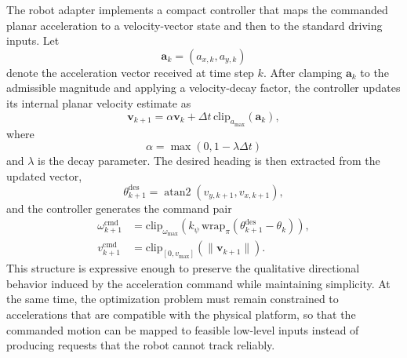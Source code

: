 The robot adapter implements a compact controller that maps the commanded planar acceleration to a
velocity-vector state and then to the standard driving inputs.
Let
\[
\mathbf{a}_k = (a_{x,k}, a_{y,k})
\]
denote the acceleration vector received at time step \(k\).
After clamping \(\mathbf{a}_k\) to the admissible magnitude and applying a velocity-decay factor, the
controller updates its internal planar velocity estimate as
\begin{equation}
\mathbf{v}_{k+1} = \alpha \mathbf{v}_k + \Delta t \,\mathrm{clip}_{a_{\max}}(\mathbf{a}_k),
\end{equation}
where
\[
\alpha = \max(0, 1 - \lambda \Delta t)
\]
and \(\lambda\) is the decay parameter.
The desired heading is then extracted from the updated vector,
\begin{equation}
\theta^{\mathrm{des}}_{k+1} = \operatorname{atan2}(v_{y,k+1}, v_{x,k+1}),
\end{equation}
and the controller generates the command pair
\begin{align}
\omega^{\mathrm{cmd}}_{k+1}
&=
\mathrm{clip}_{\omega_{\max}}
\!\left(
 k_\psi\,\mathrm{wrap}_\pi\!\left(\theta^{\mathrm{des}}_{k+1} - \theta_k\right)
\right), \\
v^{\mathrm{cmd}}_{k+1}
&=
\mathrm{clip}_{[0,v_{\max}]}\!\left(\lVert \mathbf{v}_{k+1} \rVert\right).
\end{align}
This structure is expressive enough to preserve the qualitative
directional behavior induced by the acceleration command while maintaining simplicity.
At the same time, the optimization problem must remain constrained to accelerations that are compatible with
the physical platform, so that the commanded motion can be mapped to feasible low-level inputs instead of
producing requests that the robot cannot track reliably.


